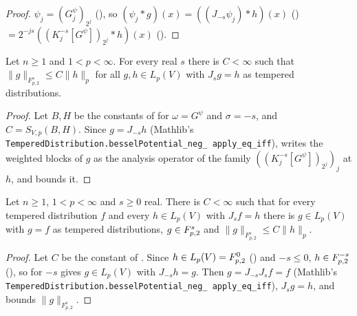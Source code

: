 \begin{proof}
\leanok
$\psi_j = (G^{\psi}_j)_{2^j}$ (), so
$(\psi_j * g)(x) = ((J_{-s} \psi_j) * h)(x)$ ()
$= 2^{-js} ((K^{-s}_j[G^{\psi}])_{2^j} * h)(x)$ ().
\end{proof}

\begin{theorem}[$H^{s,p} \subseteq \TL{s}{p}{2}$ on $L_p$]
\label{thm:bessel-to-triebel-lizorkin-lp}
\leanok
{}
Let $n \geq 1$ and $1 < p < \infty$. For every real $s$ there is $C < \infty$ such that
$\|g\|_{F^s_{p,2}} \leq C \|h\|_p$ for all $g, h \in L_p(V)$ with $J_s g = h$ as tempered
distributions.
\end{theorem}

\begin{proof}
\leanok
Let $B, H$ be the constants of  for $\omega = G^{\psi}$ and
$\sigma = -s$, and $C = S_{V,p}(B, H)$. Since $g = J_{-s} h$ (Mathlib's
\texttt{TemperedDistribution.\allowbreak besselPotential\_\allowbreak neg\_\allowbreak
apply\_\allowbreak eq\_\allowbreak iff}),  writes the weighted
blocks of $g$ as the analysis operator of the family $((K^{-s}_j[G^{\psi}])_{2^j})_j$ at $h$,
and  bounds it.
\end{proof}

\begin{theorem}
\label{thm:bessel-to-triebel-lizorkin}
\leanok
{}
Let $n \geq 1$, $1 < p < \infty$ and $s \geq 0$ real. There is $C < \infty$ such that for every
tempered distribution $f$ and every $h \in L_p(V)$ with $J_s f = h$ there is $g \in L_p(V)$ with
$g = f$ as tempered distributions, $g \in F^{s}_{p,2}$ and $\|g\|_{F^s_{p,2}} \leq C \|h\|_p$.
\end{theorem}

\begin{proof}
\leanok
Let $C$ be the constant of . Since
$h \in L_p(V) = F^{0}_{p,2}$ () and $-s \leq 0$,
$h \in F^{-s}_{p,2}$ (), so  for
$-s$ gives $g \in L_p(V)$ with $J_{-s} h = g$. Then $g = J_{-s} J_s f = f$ (Mathlib's
\texttt{TemperedDistribution.\allowbreak besselPotential\_\allowbreak neg\_\allowbreak
apply\_\allowbreak eq\_\allowbreak iff}), $J_s g = h$, and
 bounds $\|g\|_{F^s_{p,2}}$.
\end{proof}

